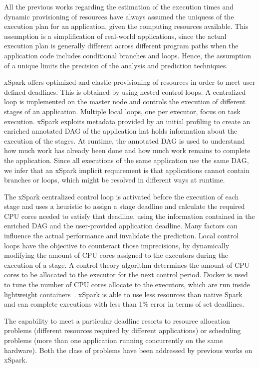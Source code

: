 All the previous works regarding the estimation of the execution times and dynamic provisioning of resources have always assumed the uniquess of the execution plan for an application, given the computing resources available. This assumption is a simplification of real-world applications, since the actual execution plan is generally different across different program paths when the application code includes conditional branches and loops. Hence, the assumption of a unique \plan limits the precision of the analysis and prediction techniques.

xSpark offers optimized and elastic provisioning of resources in order to meet user defined deadlines. This is obtained by using nested control loops. A centralized loop is implemented on the master node and controls the execution of different stages of an application. Multiple local loops, one per executor, focus on task execution. xSpark exploits metadata provided by an initial profiling to create an enriched annotated DAG of the application hat holds information about the execution of the stages. At runtime, the annotated DAG is used to understand how much work has already been done and how much work remains to complete the application. Since all executions of the same application use the same DAG, we infer that an xSpark implicit requirement is that applications cannot contain branches or loops, which might be resolved in different ways at runtime. 

The xSpark centralized control loop is activated before the execution of each stage and uses a heuristic to assign a stage deadline and calculate the required CPU cores needed to satisfy that deadline, using the information contained in the enriched DAG and the user-provided  application deadline. Many factors can influence the actual performance and invalidate the prediction. Local control loops have the objective to counteract those imprecisions, by dynamically modifying the amount of CPU cores assigned to the executors during the execution of a stage. A control theory algorithm determines the amount of CPU cores to be allocated to the executor for the next control period. Docker is used to tune the number of CPU cores allocate to the executors, which are run inside lightweight containers~\cite{misc:Docker}. xSpark is able to use less resources than native Spark and can complete executions with less than 1\% error in terms of set deadlines.

The capability to meet a particular deadline resorts to resource allocation problems (different resources required by different applications) or scheduling problems (more than one application running concurrently on the same hardware). Both the class of problems have been addressed by previous works on xSpark. 

